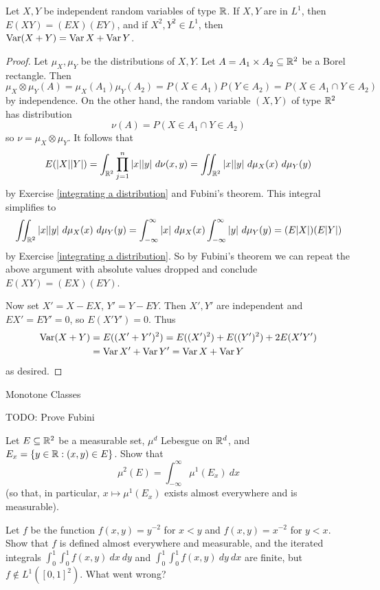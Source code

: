 \begin{corollary}
Let $X,Y$ be independent random variables of type $\mathbb{R}$. If $X,Y$ are in $L^1$, then $E(XY) = (EX)(EY)$, and if $X^2, Y^2 \in L^1$, then $\operatorname{Var}(X+Y) = \operatorname{Var} X + \operatorname{Var} Y$.
\end{corollary}
\begin{proof}
Let $\mu_X,\mu_Y$ be the distributions of $X,Y$.
Let $A = A_1 \times A_2 \subseteq \mathbb{R}^2$ be a Borel rectangle.
Then
\[\mu_{X} \otimes \mu_Y(A) = \mu_X(A_1) \mu_Y(A_2) = P(X \in A_1) P(Y \in A_2) = P(X \in A_1 \cap Y \in A_2)\]
by independence. On the other hand, the random variable $(X, Y)$ of type $\mathbb{R}^2$ has distribution
\[\nu(A) = P(X \in A_1 \cap Y \in A_2)\]
so $\nu = \mu_{X} \otimes \mu_Y$.
It follows that
\[E(|X||Y|) = \int_{\mathbb{R}^2} \prod_{j=1}^{n} |x||y| ~d\nu(x, y) = \iint_{\mathbb{R}^2} |x||y| ~d\mu_X(x)~d\mu_Y(y)\]
by Exercise \ref{integrating a distribution} and Fubini's theorem. This integral simplifies to
\[\iint_{\mathbb{R}^2} |x||y| ~d\mu_X(x)~d\mu_Y(y) = \int_{-\infty}^{\infty} |x| ~d\mu_X(x) \int_{-\infty}^{\infty} |y| ~d\mu_Y(y) = (E|X|)(E|Y|)\]
by Exercise \ref{integrating a distribution}.
So by Fubini's theorem we can repeat the above argument with absolute values dropped and conclude $E(XY) = (EX)(EY)$.

Now set $X' = X - EX$, $Y' = Y - EY$. Then $X',Y'$ are independent and $EX' = EY' = 0$, so $E(X'Y') = 0$.
Thus
\begin{align*}\operatorname{Var}(X + Y) &= E((X' + Y')^2) = E((X')^2) + E((Y')^2) + 2E(X'Y') \\
&= \operatorname{Var} X' + \operatorname{Var} Y' = \operatorname{Var} X + \operatorname{Var} Y
\end{align*}
as desired.
\end{proof}

Monotone Classes

TODO: Prove Fubini

\begin{exercise}
Let $E \subseteq \mathbb{R}^2$ be a measurable set, $\mu^d$ Lebesgue on $\mathbb{R}^d$, and $E_{x} = \{y \in \mathbb{R}: (x, y) \in E\}$.
Show that
\[\mu^2(E) = \int_{-\infty}^{\infty} \mu^1(E_x)~dx\]
(so that, in particular, $x \mapsto \mu^1(E_x)$ exists almost everywhere and is measurable).
\end{exercise}

\begin{exercise}
Let $f$ be the function $f(x, y) = y^{-2}$ for $x < y$ and $f(x, y) = x^{-2}$ for $y < x$.
Show that $f$ is defined almost everywhere and measurable, and the iterated integrals $\int_0^1\int_0^1 f(x,y)~dx~dy$ and $\int_0^1\int_0^1 f(x,y)~dy~dx$ are finite, but $f \notin L^1([0, 1]^2)$.
What went wrong?
\end{exercise}

